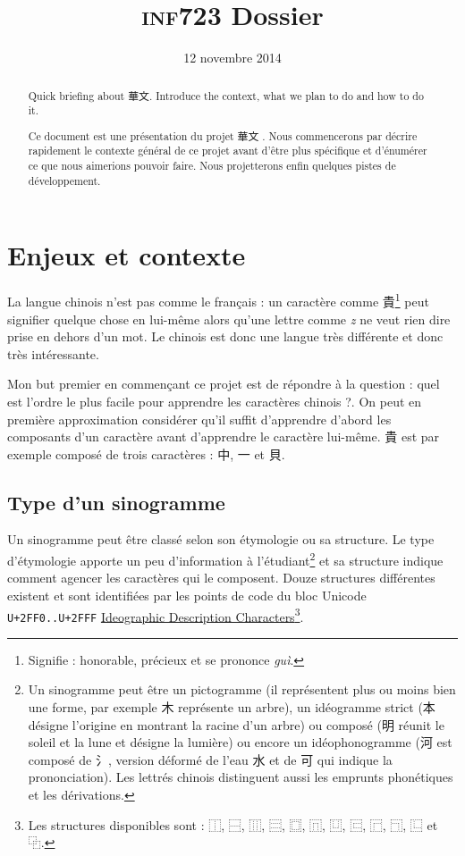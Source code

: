 \documentclass[12pt,oneside]{article}
\title{\textsc{inf723} Dossier}
\date{12 novembre 2014}
\begin{document}

\maketitle

\begin{abstract}\foreignlanguage{english}{Quick briefing about {華文}. Introduce the context, what we plan to do and how to do it.}\par Ce document est une présentation du projet \og 華文 \fg{}. Nous commencerons par décrire rapidement le contexte général de ce projet avant d'être plus spécifique et d'énumérer ce que nous aimerions pouvoir faire. Nous projetterons enfin quelques pistes de développement.\end{abstract}
\tableofcontents

\section{Enjeux et contexte}

La langue chinois n'est pas comme le français : un caractère comme {貴}\footnote{Signifie : honorable, précieux et se prononce \textsl{guì}.} peut signifier quelque chose en lui-même alors qu'une lettre comme \textsl{z} ne veut rien dire prise en dehors d'un mot. Le chinois est donc une langue très différente et donc très intéressante.

Mon but premier en commençant ce projet est de répondre à la question : \og quel est l'ordre le plus facile pour apprendre les caractères chinois ?\fg{}. On peut en première approximation considérer qu'il suffit d'apprendre d'abord les composants d'un caractère avant d'apprendre le caractère lui-même. 貴 est par exemple composé de trois caractères : {中}, 一 et {貝}.

\subsection{Type d'un sinogramme}

Un sinogramme peut être classé selon son étymologie ou sa structure. Le type d'étymologie apporte un peu d'information à l'étudiant\footnote{Un sinogramme peut être un pictogramme (il représentent plus ou moins bien une forme, par exemple 木 représente un arbre), un idéogramme strict ({本} désigne l'origine en montrant la racine d'un arbre) ou composé ({明} réunit le soleil et la lune et désigne la lumière) ou encore un idéophonogramme ({河} est composé de {氵}, version déformé de l'eau {水} et de {可} qui indique la prononciation). Les lettrés chinois distinguent aussi les emprunts phonétiques et les dérivations.} et sa structure indique comment agencer les caractères qui le composent. Douze structures différentes existent et sont identifiées par les points de code du bloc Unicode \texttt{U+2FF0..U+2FFF} \href{https://en.wikipedia.org/wiki/Ideographic\_Description\_Characters\_\%28Unicode\_block\%29}{Ideographic Description Characters}\footnote{Les structures disponibles sont : {⿰}, {⿱}, {⿲}, {⿳}, {⿴}, {⿵}, {⿶}, {⿷}, {⿸}, {⿹}, {⿺} et {⿻}.}.
\end{document}
